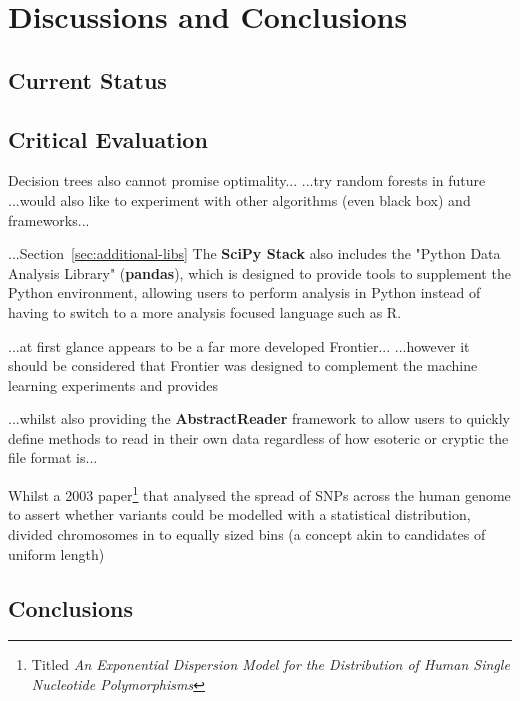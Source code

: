 \part{Discussions and Conclusions}
\chapter{Current Status}

\chapter{Critical Evaluation}
Decision trees also cannot promise optimality...
...try random forests in future
...would also like to experiment with other algorithms (even black box) and frameworks...

...Section~\ref{sec:additional-libs}
The \textbf{SciPy Stack} also includes the "Python Data Analysis Library"
(\textbf{pandas}), which is designed to provide tools to supplement the Python
environment, allowing users to perform analysis in Python instead of having to
switch to a more analysis focused language such as R.

...at first glance appears to be a far more developed Frontier...
...however it should be considered that Frontier was designed to complement the
machine learning experiments and provides 

...whilst also providing the \textbf{AbstractReader} framework to allow users to
quickly define methods to read in their own data regardless of how esoteric or
cryptic the file format is...


Whilst a 2003 paper\citep{kendal2003exponential}\footnote{Titled \textit{An Exponential
Dispersion Model for the Distribution of Human Single Nucleotide
Polymorphisms}\citep{kendal2003exponential}} that analysed the spread of SNPs
across the human genome to assert whether variants could be modelled with a
statistical distribution, divided chromosomes in to equally sized bins (a
concept akin to candidates of uniform length)

\chapter{Conclusions}

